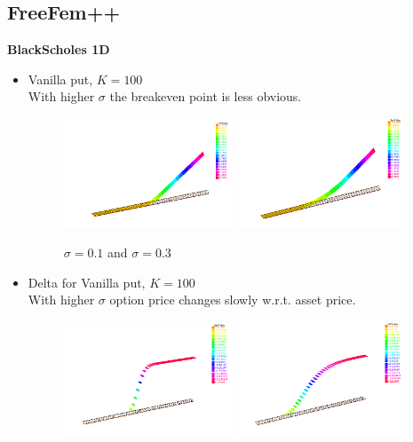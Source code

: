 \documentclass[a4paper]{report}
\begin{document}
\begin{itemize}
\subsection{FreeFem++}
\textbf{BlackScholes 1D}
\begin{itemize}
\item {Vanilla put, $K=100$}\\
With higher $\sigma$ the breakeven point is less obvious.
\begin{figure}[H]
   \includegraphics[width=0.475\textwidth]{s01.png}
   \hfill
   \includegraphics[width=0.475\textwidth]{s03.png}
    \caption{ $\sigma=0.1$ and $\sigma=0.3$}
\end{figure}
\item {Delta for Vanilla put, $K=100$}\\
With higher $\sigma$  option price changes slowly w.r.t. asset price. 
\begin{figure}[H]
   \includegraphics[width=0.475\textwidth]{d01.png}
   \hfill
   \includegraphics[width=0.475\textwidth]{d03.png}

\end{figure}
\end{itemize}
\end{itemize}
\end{document}
